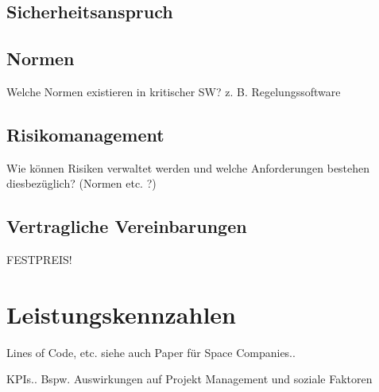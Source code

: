 \subsection{Sicherheitsanspruch}

\subsection{Normen}

Welche Normen existieren in kritischer SW? z. B. Regelungssoftware

\subsection{Risikomanagement}

Wie können Risiken verwaltet werden und welche Anforderungen bestehen diesbezüglich? (Normen etc. ?)

\subsection{Vertragliche Vereinbarungen}

FESTPREIS!

\section{Leistungskennzahlen} %

Lines of Code, etc.
siehe auch Paper für Space Companies..

KPIs..
Bspw. Auswirkungen auf Projekt Management und soziale Faktoren
